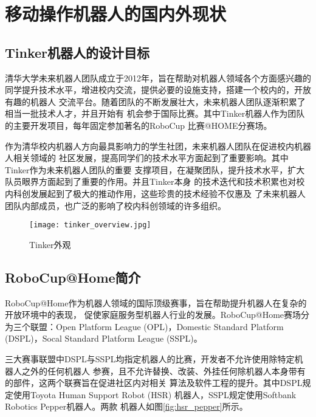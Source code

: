 
\chapter{移动操作机器人的国内外现状}
\label{cha:intro}

\section{Tinker机器人的设计目标}

清华大学未来机器人团队成立于2012年，旨在帮助对机器人领域各个方面感兴趣的
同学提升技术水平，增进校内交流，提供必要的设施支持，搭建一个校内的，开放有趣的机器人
交流平台。随着团队的不断发展壮大，未来机器人团队逐渐积累了相当一批技术人才，并且开始有
机会参于国际比赛。其中Tinker机器人作为团队的主要开发项目，每年固定参加著名的RoboCup
比赛@HOME分赛场\cite{wisspeintner2009robocup}。

作为清华校内机器人方向最具影响力的学生社团，未来机器人团队在促进校内机器人相关领域的
社区发展，提高同学们的技术水平方面起到了重要影响。其中Tinker作为未来机器人团队的重要
支撑项目，在凝聚团队，提升技术水平，扩大队员眼界方面起到了重要的作用。并且Tinker本身
的技术迭代和技术积累也对校内科创发展起到了极大的推动作用，这些珍贵的技术经验不仅惠及
了未来机器人团队内部成员，也广泛的影响了校内科创领域的许多组织。

\begin{figure}
  \centering
  \texttt{[image: tinker\_overview.jpg]}
  \caption{Tinker外观}
  \label{fig:tinker_overview}
\end{figure}


\section{RoboCup@Home简介}

RoboCup@Home作为机器人领域的国际顶级赛事，旨在帮助提升机器人在复杂的开放环境中的表现，
促使家庭服务型机器人行业的发展。RoboCup@Home赛场分为三个联盟：Open Platform League
(OPL)，Domestic Standard Platform (DSPL)，Socal Standard Platform League
 (SSPL)。

三大赛事联盟中DSPL与SSPL均指定机器人的比赛，开发者不允许使用除特定机器人之外的任何机器人
参赛，且不允许替换、改装、外挂任何除机器人本身带有的部件，这两个联赛旨在促进社区内对相关
算法及软件工程的提升。其中DSPL规定使用Toyota Human Support Robot (HSR)\cite{toyota_hsr}
机器人，SSPL规定使用Softbank Robotics Pepper\cite{pandey2018mass}机器人。两款
机器人如图\ref{fig:hsr_pepper}所示。

